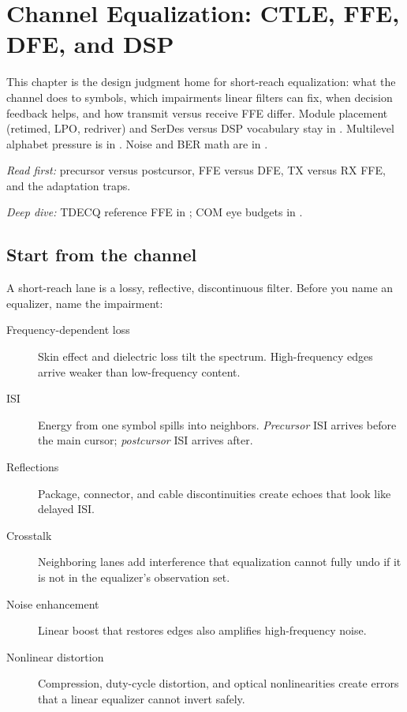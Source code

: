 \chapter{Channel Equalization: CTLE, FFE, DFE, and DSP}
\label{ch:equalization}
\label{sec:equalization}

This chapter is the design judgment home for short-reach equalization: what the
channel does to symbols, which impairments linear filters can fix, when
decision feedback helps, and how transmit versus receive FFE differ. Module
placement (retimed, LPO, redriver) and SerDes versus DSP vocabulary stay in
. Multilevel alphabet pressure is in
. Noise and BER math are in .

\textit{Read first:} precursor versus postcursor, FFE versus DFE, TX versus RX
FFE, and the adaptation traps.

\textit{Deep dive:} TDECQ reference FFE in ; COM eye budgets in
.


\section{Start from the channel}
\label{sec:eq-channel}

A short-reach lane is a lossy, reflective, discontinuous filter. Before you name
an equalizer, name the impairment:

\begin{description}
\item[Frequency-dependent loss] Skin effect and dielectric loss tilt the
      spectrum. High-frequency edges arrive weaker than low-frequency content.
\item[ISI] Energy from one symbol spills into neighbors. \emph{Precursor} ISI
      arrives before the main cursor; \emph{postcursor} ISI arrives after.
\item[Reflections] Package, connector, and cable discontinuities create echoes
      that look like delayed ISI.
\item[Crosstalk] Neighboring lanes add interference that equalization cannot
      fully undo if it is not in the equalizer's observation set.
\item[Noise enhancement] Linear boost that restores edges also amplifies
      high-frequency noise.
\item[Nonlinear distortion] Compression, duty-cycle distortion, and optical
      nonlinearities create errors that a linear equalizer cannot invert safely.
\end{description}

